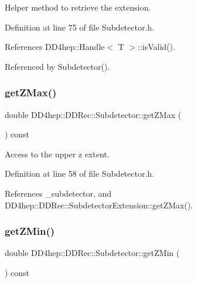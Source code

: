 Helper method to retrieve the extension. 



Definition at line 75 of file Subdetector.\+h.



References D\+D4hep\+::\+Handle$<$ T $>$\+::is\+Valid().



Referenced by Subdetector().

\hypertarget{class_d_d4hep_1_1_d_d_rec_1_1_subdetector_af831a3c2b8fc53dfe2a01e0c39ad2a0e}{}\label{class_d_d4hep_1_1_d_d_rec_1_1_subdetector_af831a3c2b8fc53dfe2a01e0c39ad2a0e} 
\subsubsection{\texorpdfstring{get\+Z\+Max()}{getZMax()}}
{\footnotesize\ttfamily double D\+D4hep\+::\+D\+D\+Rec\+::\+Subdetector\+::get\+Z\+Max (\begin{DoxyParamCaption}{ }\end{DoxyParamCaption}) const\hspace{0.3cm}{\ttfamily [inline]}}



Access to the upper z extent. 



Definition at line 58 of file Subdetector.\+h.



References \+\_\+subdetector, and D\+D4hep\+::\+D\+D\+Rec\+::\+Subdetector\+Extension\+::get\+Z\+Max().

\hypertarget{class_d_d4hep_1_1_d_d_rec_1_1_subdetector_ac40859c553f3f1389b43376eb27173d9}{}\label{class_d_d4hep_1_1_d_d_rec_1_1_subdetector_ac40859c553f3f1389b43376eb27173d9} 
\subsubsection{\texorpdfstring{get\+Z\+Min()}{getZMin()}}
{\footnotesize\ttfamily double D\+D4hep\+::\+D\+D\+Rec\+::\+Subdetector\+::get\+Z\+Min (\begin{DoxyParamCaption}{ }\end{DoxyParamCaption}) const\hspace{0.3cm}{\ttfamily [inline]}}



